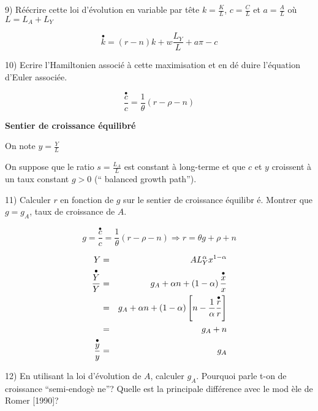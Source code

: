 \documentclass[a4paper]{article}
\begin{document}
\bigskip

9) R\'{e}\'{e}crire cette loi d'\'{e}volution en variable par t\^{e}te $k=%
\frac{K}{L}$, $c=\frac{C}{L}$ et $a=\frac{A}{L}$ o\`{u} $L=L_{A}+L_{Y}$

\begin{equation*}
\overset{\bullet }{k}=(r-n)k+w\frac{L_{Y}}{L}+a\pi -c
\end{equation*}

10) Ecrire l'Hamiltonien associ\'{e} \`{a} cette maximisation et en d\'{e}%
duire l'\'{e}quation d'Euler associ\'{e}e.

\begin{equation*}
\frac{\overset{\bullet }{c}}{c}=\frac{1}{\theta }(r-\rho -n)
\end{equation*}

\bigskip

\textbf{Sentier de croissance \'{e}quilibr\'{e}}

\bigskip

On note $y=\frac{Y}{L}$

On suppose que le ratio $s=\frac{L_{A}}{L}$ est constant \`{a} long-terme et
que $c$ et $y$ croissent \`{a} un taux constant $g>0$ (\textquotedblleft
balanced growth path\textquotedblright ).

\bigskip

11) Calculer $r$ en fonction de $g$ sur le sentier de croissance \'{e}quilibr%
\'{e}. Montrer que $g=g_{A}$, taux de croissance de $A.$

\begin{equation*}
g=\frac{\overset{\bullet }{c}}{c}=\frac{1}{\theta }(r-\rho -n)\Rightarrow
r=\theta g+\rho +n
\end{equation*}

\begin{eqnarray*}
Y &=&AL_{Y}^{\alpha }x^{1-\alpha } \\
\frac{\overset{\bullet }{Y}}{Y} &=&g_{A}+\alpha n+\left( 1-\alpha \right) 
\frac{\overset{\bullet }{x}}{x} \\
&=&g_{A}+\alpha n+\left( 1-\alpha \right) \left[ n-\frac{1}{\alpha }\frac{%
\overset{\bullet }{r}}{r}\right] \\
&=&g_{A}+n \\
\frac{\overset{\bullet }{y}}{y} &=&g_{A}
\end{eqnarray*}

\bigskip

12) En utilisant la loi d'\'{e}volution de $A$, calculer $g_{A}$. Pourquoi
parle t-on de croissance \textquotedblleft semi-endog\`{e}%
ne\textquotedblright ? Quelle est la principale diff\'{e}rence avec le mod%
\`{e}le de Romer [1990]?
\end{document}
